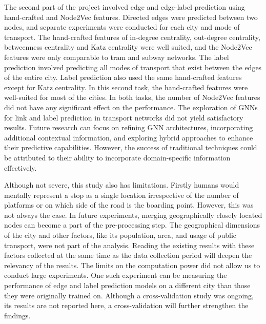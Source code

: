 \documentclass{article}
\theoremstyle{plain}
\theoremstyle{definition}
\theoremstyle{remark}
\begin{document}
The second part of the project involved edge and edge-label prediction using hand-crafted and Node2Vec features. Directed edges were predicted between two nodes, and separate experiments were conducted for each city and mode of transport. The hand-crafted features of in-degree centrality, out-degree centrality, betweenness centrality and Katz centrality were well suited, and the Node2Vec features were only comparable to tram and subway networks. The label prediction involved predicting all modes of transport that exist between the edges of the entire city. Label prediction also used the same hand-crafted features except for Katz centrality. In this second task, the hand-crafted features were well-suited for most of the cities. In both tasks, the number of Node2Vec features did not have any significant effect on the performance. The exploration of GNNs for link and label prediction in transport networks did not yield satisfactory results. Future research can focus on refining GNN architectures, incorporating additional contextual information, and exploring hybrid approaches to enhance their predictive capabilities. However, the success of traditional techniques could be attributed to their ability to incorporate domain-specific information effectively.

Although not severe, this study also has limitations. Firstly humans would mentally represent a stop as a single location irrespective of the number of platforms or on which side of the road is the boarding point. However, this was not always the case. In future experiments, merging geographically closely located nodes can become a part of the pre-processing step. The geographical dimensions of the city and other factors, like its population, area, and usage of public transport, were not part of the analysis. Reading the existing results with these factors collected at the same time as the data collection period will deepen the relevancy of the results. The limits on the computation power did not allow us to conduct large experiments. One such experiment can be measuring the performance of edge and label prediction models on a different city than those they were originally trained on. Although a cross-validation study was ongoing, its results are not reported here, a cross-validation will further strengthen the findings.






\end{document}
